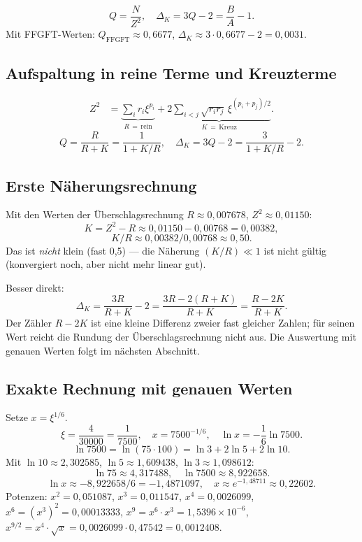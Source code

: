 \[
  Q = \frac{N}{Z^2}, \quad
  \Delta_K = 3Q-2 = \frac{B}{A}-1.
\]
Mit FFGFT-Werten: $Q_{\text{FFGFT}}\approx0{,}6677$,
$\Delta_K\approx3\cdot0{,}6677-2=0{,}0031$.

\subsection{Aufspaltung in reine Terme und Kreuzterme}

\begin{align*}
  Z^2 &= \underbrace{\sum_ir_i\xi^{p_i}}_{R\,=\,\text{rein}}
      + \underbrace{2\sum_{i<j}\sqrt{r_ir_j}\,\xi^{(p_i+p_j)/2}}_{K\,=\,\text{Kreuz}}.
\end{align*}
\[
  Q = \frac{R}{R+K} = \frac{1}{1+K/R}, \quad
  \Delta_K = 3Q-2 = \frac{3}{1+K/R}-2.
\]

\subsection{Erste Näherungsrechnung}

Mit den Werten der Überschlagsrechnung $R\approx0{,}007678$, $Z^2\approx0{,}01150$:
\[
  K = Z^2-R\approx0{,}01150-0{,}00768=0{,}00382,
\]
\[
  K/R\approx0{,}00382/0{,}00768\approx0{,}50.
\]
Das ist \emph{nicht} klein (fast 0,5) — die Näherung $(K/R)\ll1$
ist nicht gültig (konvergiert noch, aber nicht mehr linear gut).

Besser direkt:
\[
  \Delta_K = \frac{3R}{R+K}-2 = \frac{3R-2(R+K)}{R+K} = \frac{R-2K}{R+K}.
\]
Der Zähler $R-2K$ ist eine kleine Differenz zweier fast gleicher Zahlen;
für seinen Wert reicht die Rundung der Überschlagsrechnung nicht aus.
Die Auswertung mit genauen Werten folgt im nächsten Abschnitt.

\subsection{Exakte Rechnung mit genauen Werten}
\label{sec:259-exakt}

Setze $x=\xi^{1/6}$.
\[
  \xi=\frac{4}{30000}=\frac{1}{7500}, \quad
  x=7500^{-1/6}, \quad
  \ln x=-\frac{1}{6}\ln7500.
\]
\[
  \ln7500=\ln(75\cdot100)=\ln3+2\ln5+2\ln10.
\]
Mit $\ln10\approx2{,}302585$, $\ln5\approx1{,}609438$, $\ln3\approx1{,}098612$:
\[
  \ln75\approx4{,}317488, \quad
  \ln7500\approx8{,}922658.
\]
\[
  \ln x\approx-8{,}922658/6=-1{,}4871097, \quad
  x\approx e^{-1{,}48711}\approx0{,}22602.
\]
Potenzen:
$x^2=0{,}051087$, $x^3=0{,}011547$, $x^4=0{,}0026099$,
$x^6=(x^3)^2=0{,}00013333$, $x^9=x^6\cdot x^3=1{,}5396\times10^{-6}$,
$x^{9/2}=x^4\cdot\sqrt{x}=0{,}0026099\cdot0{,}47542=0{,}0012408$.

